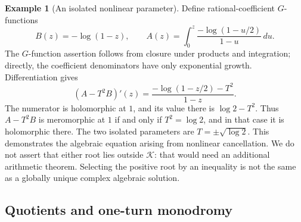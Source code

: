 \documentclass[11pt,a4paper]{article}
\theoremstyle{definition}
\newtheorem{example}[theorem]{Example}
\theoremstyle{remark}
\numberwithin{equation}{section}
\begin{document}
\begin{example}[An isolated nonlinear parameter]
\label{p6:hol:square-example}
Define rational-coefficient $G$-functions
\[
 B(z)=-\log(1-z),\qquad
 A(z)=\int_0^z\frac{-\log(1-u/2)}{1-u}\,du.
\]
The $G$-function assertion follows from closure under products
and integration; directly, the coefficient denominators have
only exponential growth.  Differentiation gives
\[
 (A-T^2B)'(z)=\frac{-\log(1-z/2)-T^2}{1-z}.
\]
The numerator is holomorphic at $1$, and its value there is
$\log2-T^2$.  Thus $A-T^2B$ is meromorphic at $1$ if and only
if $T^2=\log2$, and in that case it is holomorphic there.
The two isolated parameters are $T=\pm\sqrt{\log2}$.
This demonstrates the algebraic equation arising from nonlinear
cancellation.  We do not assert that either root lies outside
$\mathcal K$: that would need an additional arithmetic theorem.
Selecting the positive root by an inequality is not the same as
a globally unique complex algebraic solution.
\end{example}

\subsection{Quotients and one-turn monodromy}
\end{document}
